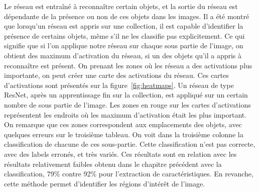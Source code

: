 Le réseau est entraîné à reconnaître certain objets, et la sortie du réseau est dépendante de la présence ou non de ces objets dans les images.
Il a été montré~\cite{zhou2014object} que lorsqu’un réseau est appris sur une collection, il est capable d’identifier la présence de certains objets, même s’il ne les classifie pas explicitement.
Ce qui signifie que si l’on applique notre réseau sur chaque sous partie de l’image, on obtient des maximum d’activation du réseau, si un des objets qu’il a appris à reconnaître est présent.
On prenant les zones où les réseau a des activations plus importante, on peut créer une carte des activations du réseau.
Ces cartes d’activations sont présentés sur la figure~\ref{fig:heatmaps}.
Un réseau de type ResNet, après un apprentissage fin sur la collection, est appliqué sur un certain nombre de sous partie de l’image.
Les zones en rouge sur les cartes d’activations représentent les endroits où les maximum d’activation était les plus important.
On remarque que ces zones correspondent aux emplacements des objets, avec quelques erreurs sur le troisième tableau.
On voit dans la troisième colonne la classification de chacune de ces sous-partie.
Cette classification n’est pas correcte, avec des labels erronés, et très variés. 
Ces résultats sont en relation avec les résultats relativement faibles obtenu dans le chapitre précédent avec la classification, 79\% contre 92\% pour l’extraction de caractéristiques. 
En revanche, cette méthode permet d'identifier les régions d'intérêt de l'image.

